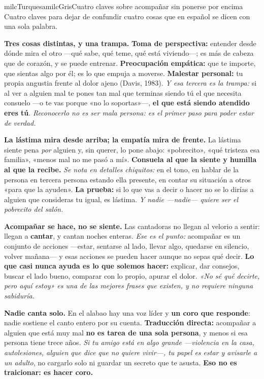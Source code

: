 \documentclass[11pt,letterpaper]{article}
\newcommand{\milcpaso}[3]{%
\Needspace{4\baselineskip}%
\begin{tcolorbox}[enhanced,colback=white,colframe=milcLinea,arc=1.5mm,boxrule=.9pt,
  left=14mm,right=4mm,top=3mm,bottom=3mm,before skip=4pt,after skip=4pt,
  fontupper=\RaggedRight,
  overlay={\node[anchor=north west,circle,fill=#2,text=white,inner sep=0pt,
    minimum size=7.4mm,font=\sffamily\bfseries\small]
    at ([xshift=3.6mm,yshift=-3.2mm]frame.north west) {#1};}]
#3
\end{tcolorbox}}
\begin{document}
\begin{softbox}{milcTurquesa}{milcGris}{Cuatro claves sobre acompañar sin ponerse por encima}
Cuatro claves para dejar de confundir cuatro cosas que en español se dicen con una sola palabra.
\end{softbox}

\milcpaso{1}{milcTurquesa}{\textbf{Tres cosas distintas, y una trampa.} \textbf{Toma de perspectiva:} entender desde dónde mira el otro ---qué sabe, qué teme, qué está viviendo---; es más de cabeza que de corazón, y se puede entrenar. \textbf{Preocupación empática:} que te importe, que sientas algo por él; es lo que empuja a moverse. \textbf{Malestar personal:} tu propia angustia frente al dolor ajeno (Davis, 1983). \emph{Y esa tercera es la trampa:} si al ver a alguien mal te pones tan mal que terminas siendo tú el que necesita consuelo ---o te vas porque «no lo soportas»---, \textbf{el que está siendo atendido eres tú}. \emph{Reconocerlo no es ser mala persona: es el primer paso para poder estar de verdad.}}
\milcpaso{2}{milcTurquesa}{\textbf{La lástima mira desde arriba; la empatía mira de frente.} La lástima siente pena \emph{por} alguien y, sin querer, lo pone abajo: «pobrecito», «qué tristeza esa familia», «menos mal no me pasó a mí». \textbf{Consuela al que la siente y humilla al que la recibe.} \emph{Se nota en detalles chiquitos:} en el tono, en hablar de la persona en tercera persona estando ella presente, en contar su situación a otros «para que la ayuden». \textbf{La prueba:} si lo que vas a decir o hacer no se lo dirías a alguien que consideras tu igual, es lástima. \emph{Y nadie ---nadie--- quiere ser el pobrecito del salón.}}
\milcpaso{3}{milcTurquesa}{\textbf{Acompañar se hace, no se siente.} Las cantadoras no llegan al velorio a sentir: llegan a \textbf{cantar}, y cantan noches enteras. \emph{Ese es el punto:} acompañar es un conjunto de acciones ---estar, sentarse al lado, llevar algo, quedarse en silencio, volver mañana--- y esas acciones se pueden hacer aunque no sepas qué decir. \textbf{Lo que casi nunca ayuda es lo que solemos hacer:} explicar, dar consejos, buscar el lado bueno, comparar con lo propio, apurar el dolor. \emph{«No sé qué decirte, pero aquí estoy» es una de las mejores frases que existen, y no requiere ninguna sabiduría.}}
\milcpaso{4}{milcTurquesa}{\textbf{Nadie canta solo.} En el alabao hay una voz líder y \textbf{un coro que responde}: nadie sostiene el canto entero por su cuenta. \textbf{Traducción directa:} acompañar a alguien que está muy mal \textbf{no es tarea de una sola persona}, y menos si esa persona tiene trece años. \emph{Si tu amigo está en algo grande ---violencia en la casa, autolesiones, alguien que dice que no quiere vivir---, tu papel es estar y avisarle a un adulto}, no cargarlo solo ni guardar un secreto que te asusta. \textbf{Eso no es traicionar: es hacer coro.}}
\end{document}
